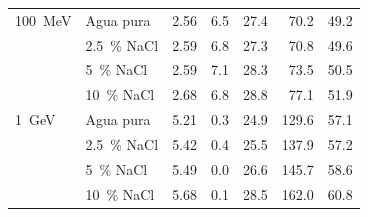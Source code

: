 \begin{tabular}{ll r rrrr}
\midrule
100~MeV & Agua pura & 2.56 & 6.5 & 27.4 & 70.2 & 49.2 \\
 & 2.5~\% NaCl & 2.59 & 6.8 & 27.3 & 70.8 & 49.6 \\
 & 5~\% NaCl & 2.59 & 7.1 & 28.3 & 73.5 & 50.5 \\
 & 10~\% NaCl & 2.68 & 6.8 & 28.8 & 77.1 & 51.9 \\
\midrule
1~GeV & Agua pura & 5.21 & 0.3 & 24.9 & 129.6 & 57.1 \\
 & 2.5~\% NaCl & 5.42 & 0.4 & 25.5 & 137.9 & 57.2 \\
 & 5~\% NaCl & 5.49 & 0.0 & 26.6 & 145.7 & 58.6 \\
 & 10~\% NaCl & 5.68 & 0.1 & 28.5 & 162.0 & 60.8 \\
\bottomrule
\end{tabular}
